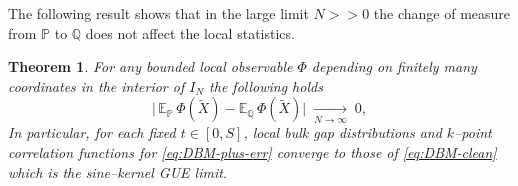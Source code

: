 \documentclass[12pt,reqno]{amsart}
\theoremstyle{plain}
\newtheorem{theorem}{Theorem}[section]
\theoremstyle{definition}
\theoremstyle{remark}
\begin{document}
The following result shows that in the large limit $N>>0$ the change of measure from $\mathbb{P}$ to $\mathbb{Q}$ does not affect the local statistics. 

\begin{theorem} \label{thm:girsanov-handoff}
For any bounded local observable $\Phi$ depending on finitely many coordinates
in the interior of $I_N$ the following holds 
\begin{equation}
\Big|\,
\mathbb E_{\mathbb{P}}\,\Phi(\widetilde X)
-\mathbb E_{\mathbb{Q}}\,\Phi(\widetilde X)\Big|
\;\xrightarrow[N\to\infty]{}\;0,
\end{equation}
In particular, for each fixed $t\in[0,S]$, local bulk gap distributions and
$k$–point correlation functions for \eqref{eq:DBM-plus-err} converge to those of
\eqref{eq:DBM-clean} which is the sine–kernel GUE limit.
\end{theorem}
\end{document}
